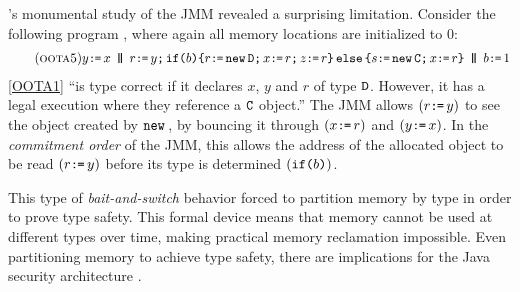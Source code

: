 \citeauthor{DBLP:journals/toplas/Lochbihler13}'s
monumental study of the JMM
revealed a surprising limitation. Consider the following program
\citep[Fig.~8]{DBLP:journals/toplas/Lochbihler13}, where again
all memory locations are initialized to $0$:
\begin{gather}
  \tag{\textsc{oota5}}\label{OOTA1}
  y\GETS x
  \PAR
  \aReg\GETS y \SEMI \IF{b} \THEN \aReg \GETS \NEW \classD \SEMI x \GETS \aReg \SEMI z\GETS \aReg \ELSE \bReg \GETS \NEW \classC \SEMI x \GETS \aReg \FI  
  \PAR %
  b \GETS 1
\end{gather}
\ref{OOTA1} ``is type correct if it declares $x$, $y$ and $r$ of type
$\mathtt{D}$. However, it has a legal execution where they reference a $\mathtt{C}$
object.''  The JMM allows $(r\texttt{:}\mkern-1mu\texttt{=}\, y)$ to see the object created by
$\texttt{new}\,$, by bouncing it through $(x \texttt{:}\mkern-1mu\texttt{=}\, r)$ and $(y\texttt{:}\mkern-1mu\texttt{=}\, x)$.  In the
\emph{commitment order} of the JMM, this allows the address of the
allocated object to be read $(r\texttt{:}\mkern-1mu\texttt{=}\, y)$ before its type is determined
$(\texttt{if}\allowbreak\texttt{(}b\texttt{)})$.



This type of \emph{bait-and-switch} behavior forced
\citeauthor{DBLP:journals/toplas/Lochbihler13} to partition memory by type in
order to prove type safety.  This formal device means that memory cannot be
used at different types over time, making practical memory reclamation
impossible.  Even partitioning memory to achieve type safety, there are
implications for the Java security architecture
\cite[]{DBLP:journals/toplas/Lochbihler13}.

